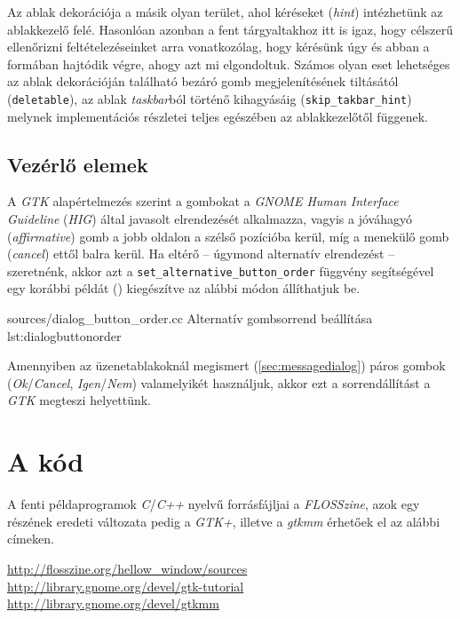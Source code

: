Az ablak dekorációja a másik olyan terület, ahol kéréseket (\textit{hint}) intézhetünk az ablakkezelő felé. Hasonlóan azonban a fent tárgyaltakhoz itt is igaz, hogy célszerű ellenőrizni feltételezéseinket arra vonatkozólag, hogy kérésünk úgy és abban a formában hajtódik végre, ahogy azt mi elgondoltuk. Számos olyan eset lehetséges az ablak dekorációján található bezáró gomb megjelenítésének tiltásától (\texttt{deletable}), az ablak \textit{taskbar}ból történő kihagyásáig (\texttt{skip\_takbar\_hint}) melynek implementációs részletei teljes egészében az ablakkezelőtől függenek.

\subsection{Vezérlő elemek}

A \textit{GTK} alapértelmezés szerint a gombokat a \textit{GNOME Human Interface Guideline}\cite{gnomehig} (\textit{HIG}) által javasolt elrendezését alkalmazza, vagyis a jóváhagyó (\textit{affirmative}) gomb a jobb oldalon a szélső pozícióba kerül, míg a menekülő gomb (\textit{cancel}) ettől balra kerül. Ha eltérő -- úgymond alternatív elrendezést -- szeretnénk, akkor azt a \texttt{set\_alternative\_button\_order} függvény segítségével egy korábbi példát () kiegészítve az alábbi módon állíthatjuk be.

{sources/dialog_button_order.cc}
{Alternatív gombsorrend beállítása}
{lst:dialogbuttonorder}

Amennyiben az üzenetablakoknál megismert (\ref{sec:messagedialog}) páros gombok (\textit{Ok}/\textit{Cancel}, \textit{Igen}/\textit{Nem}) valamelyikét használjuk, akkor ezt a sorrendállítást a \textit{GTK} megteszi helyettünk.

\section{A kód}

A fenti példaprogramok \textit{C}/\textit{C++} nyelvű forrásfájljai a \textit{FLOSSzine}, azok egy részének eredeti változata pedig a \textit{GTK+}, illetve a \textit{gtkmm} érhetőek el az alábbi címeken.

\medskip
\noindent
\url{http://flosszine.org/hellow_window/sources}\\
\url{http://library.gnome.org/devel/gtk-tutorial}\\
\url{http://library.gnome.org/devel/gtkmm}

